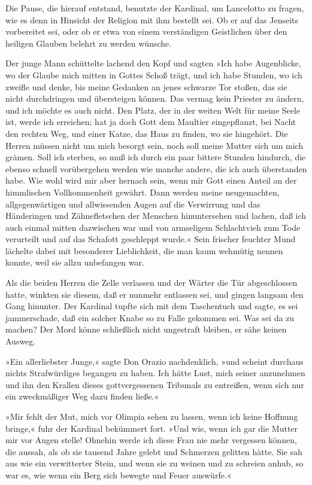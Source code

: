 \pagenum{[63]} Die Pause, die hierauf entstand, benutzte der
Kardinal, um Lancelotto zu fragen, wie es denn in Hinsicht der
Religion mit ihm bestellt sei. Ob er auf das Jenseits vorbereitet
sei, oder ob er etwa von einem verständigen Geistlichen über den
heiligen Glauben belehrt zu werden wünsche.

Der junge Mann schüttelte lachend den Kopf und sagten »Ich habe
Augenblicke, wo der Glaube mich mitten in Gottes Schoß trägt, und
ich habe Stunden, wo ich zweifle und denke, bis meine Gedanken an
jenes schwarze Tor stoßen, das sie nicht durchdringen und
übersteigen können. Das vermag kein Priester zu ändern, und ich
möchte es auch nicht. Den Platz, der in der weiten Welt für meine
Seele ist, werde ich erreichen; hat ja doch Gott dem Maultier
eingepflanzt, bei Nacht den rechten Weg, und einer Katze, das Haus
zu finden, wo sie hingehört. Die Herren müssen nicht um mich
besorgt sein, noch soll meine Mutter sich um mich grämen. Soll ich
sterben, so muß ich durch ein paar bittere Stunden hindurch, die
ebenso schnell vorübergehen werden wie manche andere, die ich auch
überstanden habe. Wie wohl wird mir aber hernach sein, wenn mir
Gott einen Anteil an der himmlischen Vollkommenheit gewährt. Dann
werden meine neugemachten, allgegenwärtigen und allwissenden Augen
auf die Verwirrung und das Händeringen und Zähnefletschen der
Menschen hinuntersehen und lachen, daß ich auch einmal mitten
dazwischen war und von armseligem Schlachtvieh zum Tode verurteilt
und auf das Schafott geschleppt wurde.« Sein frischer feuchter Mund
lächelte dabei mit besonderer Lieblichkeit, die man kaum wehmütig
nennen konnte, weil sie allzu unbefangen war.

Als die beiden Herren die Zelle verlassen und der Wärter die Tür
abgeschlossen hatte, winkten sie diesem, daß er \pagenum{[64]}
nunmehr entlassen sei, und gingen langsam den Gang hinunter. Der
Kardinal tupfte sich mit dem Taschentuch und sagte, es sei
jammerschade, daß ein solcher Knabe so zu Falle gekommen sei. Was
sei da zu machen? Der Mord könne schließlich nicht ungestraft
bleiben, er sähe keinen Ausweg.

»Ein allerliebster Junge,« sagte Don Orazio nachdenklich, »und
scheint durchaus nichts Strafwürdiges begangen zu haben. Ich hätte
Lust, mich seiner anzunehmen und ihn den Krallen dieses
gottvergessenen Tribunals zu entreißen, wenn sich nur ein
zweckmäßiger Weg dazu finden ließe.«

»Mir fehlt der Mut, mich vor Olimpia sehen zu lassen, wenn ich
keine Hoffnung bringe,« fuhr der Kardinal bekümmert fort. »Und wie,
wenn ich gar die Mutter mir vor Augen stelle! Ohnehin werde ich
diese Frau nie mehr vergessen können, die aussah, als ob sie
tausend Jahre gelebt und Schmerzen gelitten hätte. Sie sah aus wie
ein verwitterter Stein, und wenn sie zu weinen und zu schreien
anhub, so war es, wie wenn ein Berg sich bewegte und Feuer
auswürfe.«

